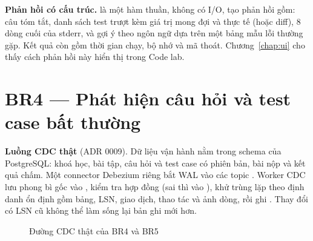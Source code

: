 \textbf{Phản hồi có cấu trúc.}  là một hàm thuần, không có I/O, tạo phản hồi gồm: câu tóm tắt, danh sách test trượt kèm giá trị mong đợi và thực tế (hoặc diff), 8 dòng cuối của stderr, và gợi ý theo ngôn ngữ dựa trên một bảng mẫu lỗi thường gặp. Kết quả còn gồm thời gian chạy, bộ nhớ và mã thoát. Chương~\ref{chap:ui} cho thấy cách phản hồi này hiển thị trong Code lab.

\section{BR4 --- Phát hiện câu hỏi và test case bất thường}

\textbf{Luồng CDC thật} (ADR 0009). Dữ liệu vận hành nằm trong schema  của PostgreSQL: khoá học, bài tập, câu hỏi và test case có phiên bản, bài nộp và kết quả chấm. Một connector Debezium riêng bắt WAL vào các topic . Worker CDC lưu phong bì gốc vào , kiểm tra hợp đồng (sai thì vào ), khử trùng lặp theo định danh ổn định gồm bảng, LSN, giao dịch, thao tác và ảnh dòng, rồi ghi . Thay đổi có LSN cũ không thể làm sống lại bản ghi mới hơn.

\begin{figure}[H]
\centering
{}
\caption{Đường CDC thật của BR4 và BR5}
\label{fig:br45}
\end{figure}

